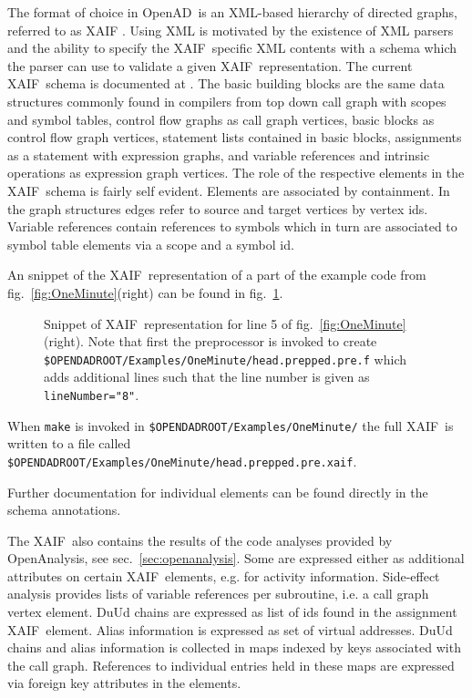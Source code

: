 \documentclass{book}
\newcommand{\OpenAD}{OpenAD}
\newcommand{\OpenAnalysis}{OpenAnalysis}
\newcommand{\xaif}{XAIF}
\newcommand{\refsec}[1]{{sec.~\ref{#1}}}
\newcommand{\reffig}[1]{{fig.~\ref{#1}}}
\begin{document}
The format of choice in \OpenAD\ is an XML-based \cite{xmlWeb} hierarchy of 
directed graphs, referred to as \xaif 
\cite{Hovland2002AXB}. Using XML is motivated by the existence of XML parsers and 
the ability to specify the \xaif\ specific XML contents with a schema which 
the parser can use to validate a given \xaif\ representation. 
The current \xaif\ schema is documented at \cite{xaifweb}.
The basic building blocks are the same data structures commonly found 
in compilers from top down call graph with scopes and symbol tables, 
control flow graphs as call graph vertices, basic blocks  as control flow 
graph vertices, statement lists contained in basic blocks, 
assignments as a statement with expression graphs,  and variable references 
and intrinsic operations as expression graph vertices. 
The role of the respective elements in the \xaif\ schema is fairly self evident. 
Elements are associated by containment. In the graph structures edges 
refer to source and target vertices by vertex ids. 
Variable references contain references to symbols which in turn 
are associated to symbol table elements via a scope and a symbol id. 

An snippet of the \xaif\ representation of a part of the 
example code  from \reffig{fig:OneMinute}(right) can be found in  
\reffig{fig:wtxxtwXaif}. 
\begin{figure}[h]
\small
{}

  \caption{Snippet of \xaif\ representation for line 5 of \reffig{fig:OneMinute}(right). Note that first the preprocessor is invoked to 
create \lstinline{$OPENDADROOT/Examples/OneMinute/head.prepped.pre.f} which adds additional lines such that the line number is given 
as \lstinline{lineNumber="8"}.}\label{fig:wtxxtwXaif}
\end{figure}
When \lstinline{make} is invoked in \lstinline{$OPENDADROOT/Examples/OneMinute/}%
the full \xaif\ is written to a file called \lstinline{$OPENDADROOT/Examples/OneMinute/head.prepped.pre.xaif}.%

Further documentation for individual elements can be found directly in the 
schema annotations. 

The \xaif\ also contains the results of the code analyses provided 
by \OpenAnalysis, see \refsec{sec:openanalysis}. Some are expressed 
either as additional attributes on certain \xaif\ elements, e.g. for activity information. 
Side-effect analysis provides lists of variable references per subroutine, i.e. a call graph vertex element.
DuUd chains are expressed as list of ids found in the assignment \xaif\ element.
Alias information is expressed as set of virtual addresses. 
DuUd chains and alias information is collected in maps indexed by keys associated with the call 
graph. References to individual entries held in these maps are expressed via foreign key 
attributes in the elements. 
\end{document}

